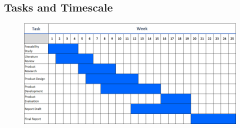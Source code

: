 \documentclass{article}
\begin{document}
	\begin{landscape}
		
		\section{Tasks and Timescale}
		
		\begin{figure}[ht]
			\centering
			\includegraphics[width=\linewidth, height=\textheight,keepaspectratio]{gantt.png}
		\end{figure}

	\end{landscape}

	\printglossaries

	
	

	

	
\end{document}
